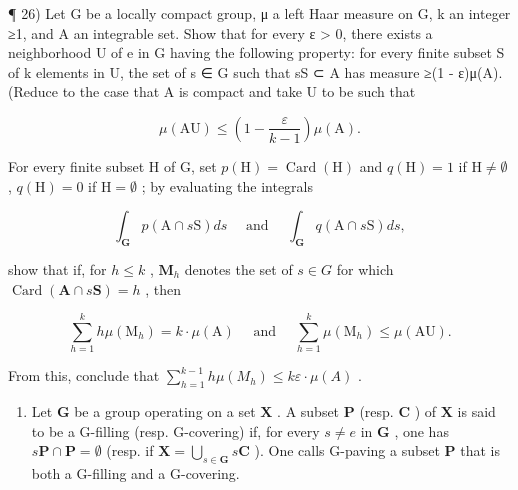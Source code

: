 ¶ 26) Let G be a locally compact group, μ a left Haar measure on G, k an integer ≥1, and A an integrable set. Show that for every ε \textgreater{} 0, there exists a neighborhood U of e in G having the following property: for every finite subset S of k elements in U, the set of s ∈ G such that sS ⊂ A has measure ≥(1 - ε)μ(A). (Reduce to the case that A is compact and take U to be such that

\[
\mu (\mathrm{AU}) \leqslant \left(1 - \frac {\varepsilon}{k - 1}\right) \mu (\mathrm{A}).
\]

For every finite subset H of G, set \(p(\mathrm{H}) = \operatorname{Card}(\mathrm{H})\) and \(q(\mathrm{H}) = 1\) if \(\mathrm{H} \neq \emptyset\) , \(q(\mathrm{H}) = 0\) if \(\mathrm{H} = \emptyset\) ; by evaluating the integrals

\[
\int_ {\mathbf {G}} p (\mathrm{A} \cap s \mathrm{S}) d s \quad \text { and } \quad \int_ {\mathbf {G}} q (\mathrm{A} \cap s \mathrm{S}) d s  ,
\]

show that if, for \(h \leqslant k\) , \(\mathbf{M}_h\) denotes the set of \(s \in G\) for which \(\operatorname{Card}(\mathbf{A} \cap s\mathbf{S}) = h\) , then

\[
\sum_ {h = 1} ^ {k} h \mu (\mathrm{M} _ {h}) = k \cdot \mu (\mathrm{A}) \quad \text { and } \quad \sum_ {h = 1} ^ {k} \mu (\mathrm{M} _ {h}) \leqslant \mu (\mathrm{AU}).
\]

From this, conclude that \(\sum_{h=1}^{k-1} h\mu(M_h) \leqslant k\varepsilon \cdot \mu(A)\) .

\begin{enumerate}
\def\labelenumi{\arabic{enumi})}
\setcounter{enumi}{26}
\tightlist
\item
  Let \(\mathbf{G}\) be a group operating on a set \(\mathbf{X}\) . A subset \(\mathbf{P}\) (resp. \(\mathbf{C}\) ) of \(\mathbf{X}\) is said to be a G-filling (resp. G-covering) if, for every \(s \neq e\) in \(\mathbf{G}\) , one has \(s\mathbf{P} \cap \mathbf{P} = \emptyset\) (resp. if \(\mathbf{X} = \bigcup_{s \in \mathbf{G}} s\mathbf{C}\) ). One calls G-paving a subset \(\mathbf{P}\) that is both a G-filling and a G-covering.
\end{enumerate}

